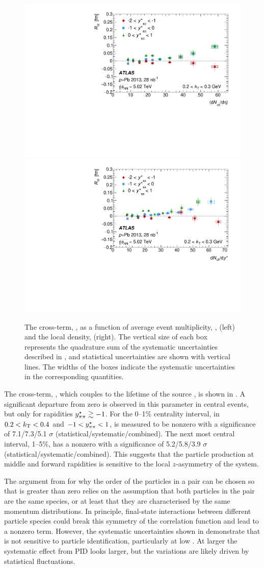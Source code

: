 \begin{figure}[t]
\centering
\includegraphics[width=0.49\linewidth]{canqosl_Rol_kt1_kys_vs_avg_mult.pdf}
\includegraphics[width=0.49\linewidth]{canqosl_Rol_kt1_vs_mult.pdf}
\caption{The cross-term, \Rol, as a function of average event multiplicity, \avgdNdeta, (left) and the local density, \dNdy (right). The vertical size of each box represents the quadrature sum of the systematic uncertainties described in , and statistical uncertainties are shown with vertical lines. The widths of the boxes indicate the systematic uncertainties in the corresponding quantities.}
\label{fig:results_Rol_mult}
\end{figure}

The cross-term, \Rol, which couples to the lifetime of the source \cite{Chapman:1994yv}, is shown in .
A significant departure from zero is observed in this parameter in central events, but only for rapidities $y^{\star}_{\pi\pi} \gtrsim -1$.
For the 0--1\% centrality interval, in $ 0.2 < k_\mathrm{T} < 0.4$ and $-1 < y^{\star}_{\pi\pi} < 1$, \Rol is measured to be nonzero with a significance of 7.1/7.3/5.1 $\sigma$ (statistical/systematic/combined).
The next most central interval, 1--5\%, has a nonzero \Rol with a significance of 5.2/5.8/3.9 $\sigma$ (statistical/systematic/combined).
This suggests that the particle production at middle and forward rapidities is sensitive to the local $z$-asymmetry of the system.

The argument from  for why the order of the particles in a pair can be chosen so that \qout is greater than zero relies on the assumption that both particles in the pair are the same species, or at least that they are characterised by the same momentum distributions.
In principle, final-state interactions between different particle species could break this symmetry of the correlation function and lead to a nonzero \Rol term. 
However, the systematic uncertainties shown in  demonstrate that \Rol is not sensitive to particle identification, particularly at low \kt.
At larger \kt the systematic effect from \ac{PID} looks larger, but the variations are likely driven by statistical fluctuations.

